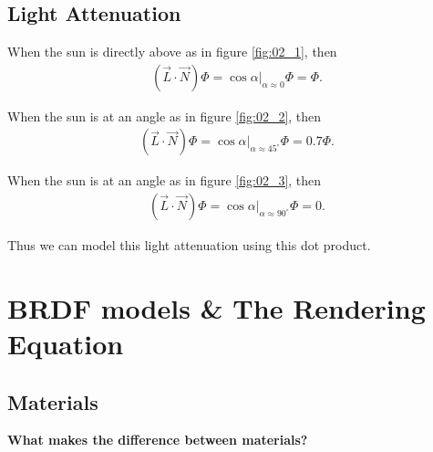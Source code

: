 \documentclass[10pt]{armath}
\numberwithin{equation}{section}
\newenvironment{Figure}
{\par\medskip\noindent\minipage{\linewidth}}
{\endminipage\par\medskip}
\theoremstyle{definition}
\begin{document}
\begin{multicols}{2}
\subsection{Light Attenuation}%
\label{sub:light_attenuation}

When the sun is directly above as in figure \ref{fig:02_1}, then
\begin{align*}
  \left(\vec{L}\cdot\vec{N}\right)\Phi=\cos\alpha|_{\alpha\approx0}\Phi=\Phi.
\end{align*}

\begin{Figure}
  \begin{center}
    
  \end{center}
  \label{fig:02_2}
\end{Figure}

When the sun is at an angle as in figure \ref{fig:02_2}, then
\begin{align*}
  \left(\vec{L}\cdot\vec{N}\right)\Phi=\cos\alpha|_{\alpha\approx45^\circ}\Phi=0.7\Phi.
\end{align*}

\begin{Figure}
  \begin{center}
    
  \end{center}
  \label{fig:02_3}
\end{Figure}

When the sun is at an angle as in figure \ref{fig:02_3}, then
\begin{align*}
  \left(\vec{L}\cdot\vec{N}\right)\Phi=\cos\alpha|_{\alpha\approx90^\circ}\Phi=0.
\end{align*}

Thus we can model this light attenuation using this dot product.

\section{BRDF models \& The Rendering Equation}%
\label{sec:brdf_models_&_the_rendering_equation}

\subsection{Materials}%
\label{sub:materials}

\textbf{What makes the difference between materials?}


\end{multicols}
\end{document}
